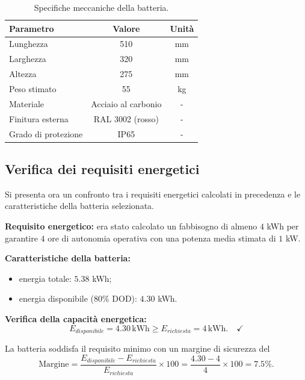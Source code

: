 \begin{table}[htbp]
    \centering
    \caption{Specifiche meccaniche della batteria.}
    \label{tab:battery_mechanical}
    \begin{tabular}{|l|c|c|}
        \hline
        \textbf{Parametro}  & \textbf{Valore}     & \textbf{Unità} \\
        \hline
        Lunghezza           & 510                 & mm             \\
        Larghezza           & 320                 & mm             \\
        Altezza             & 275                 & mm             \\
        Peso stimato        & 55                  & kg             \\
        Materiale           & Acciaio al carbonio & -              \\
        Finitura esterna    & RAL 3002 (rosso)    & -              \\
        Grado di protezione & IP65                & -              \\
        \hline
    \end{tabular}
\end{table}

\subsection{Verifica dei requisiti energetici}
Si presenta ora un confronto tra i requisiti energetici calcolati in precedenza e le caratteristiche della batteria selezionata.

\textbf{Requisito energetico:} era stato calcolato un fabbisogno di almeno $4$ kWh per garantire $4$ ore di autonomia operativa con una potenza media stimata di $1$ kW.

\textbf{Caratteristiche della batteria:}
\begin{itemize}
    \item energia totale: $5.38$ kWh;
    \item energia disponibile (80\% DOD): $4.30$ kWh.
\end{itemize}

\textbf{Verifica della capacità energetica:}
\begin{equation}
    E_{disponibile} = 4.30 \, \text{kWh} \geq E_{richiesta} = 4 \, \text{kWh}. \quad \checkmark
\end{equation}

La batteria soddisfa il requisito minimo con un margine di sicurezza del
\begin{equation}
    \text{Margine} = \frac{E_{disponibile} - E_{richiesta}}{E_{richiesta}} \times 100 = \frac{4.30 - 4}{4} \times 100 = 7.5\%.
\end{equation}

